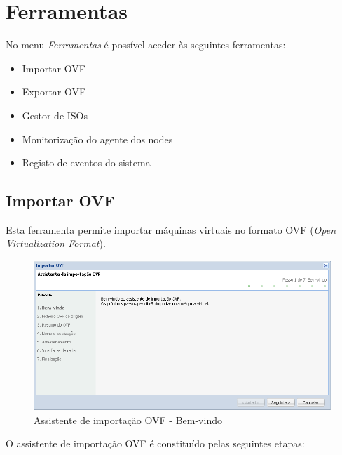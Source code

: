 \section{Ferramentas}

No menu \emph{Ferramentas} é possível aceder às seguintes ferramentas:
\begin{itemize}
\item Importar OVF
\item Exportar OVF
\item Gestor de ISOs
\item Monitorização do agente dos nodes
\item Registo de eventos do sistema
\end{itemize}

\subsection{Importar OVF}
Esta ferramenta permite importar máquinas virtuais no formato OVF (\emph{Open Virtualization Format}).

\begin{figure}[H]
	\begin{center}
	\includegraphics[scale=0.5]{screenshots/ovf_import.png}
	\caption{Assistente de importação OVF - Bem-vindo}
	\label{fig:ovf_import_wiz}
	\end{center}
\end{figure}

O assistente de importação OVF é constituído pelas seguintes etapas:

